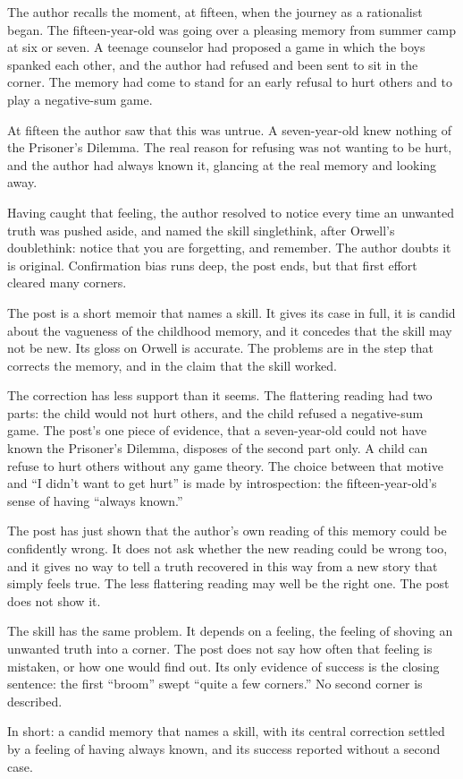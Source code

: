 \begin{afterword}
\summaryhead

The author recalls the moment, at fifteen, when the journey as a rationalist began. The fifteen-year-old was going over a pleasing memory from summer camp at six or seven. A teenage counselor had proposed a game in which the boys spanked each other, and the author had refused and been sent to sit in the corner. The memory had come to stand for an early refusal to hurt others and to play a negative-sum game.

At fifteen the author saw that this was untrue. A seven-year-old knew nothing of the Prisoner's Dilemma. The real reason for refusing was not wanting to be hurt, and the author had always known it, glancing at the real memory and looking away.

Having caught that feeling, the author resolved to notice every time an unwanted truth was pushed aside, and named the skill singlethink, after Orwell's doublethink: notice that you are forgetting, and remember. The author doubts it is original. Confirmation bias runs deep, the post ends, but that first effort cleared many corners.

\responsehead

The post is a short memoir that names a skill. It gives its case in full, it is candid about the vagueness of the childhood memory, and it concedes that the skill may not be new. Its gloss on Orwell is accurate. The problems are in the step that corrects the memory, and in the claim that the skill worked.

The correction has less support than it seems. The flattering reading had two parts: the child would not hurt others, and the child refused a negative-sum game. The post's one piece of evidence, that a seven-year-old could not have known the Prisoner's Dilemma, disposes of the second part only. A child can refuse to hurt others without any game theory. The choice between that motive and ``I didn't want to get hurt'' is made by introspection: the fifteen-year-old's sense of having ``always known.''

The post has just shown that the author's own reading of this memory could be confidently wrong. It does not ask whether the new reading could be wrong too, and it gives no way to tell a truth recovered in this way from a new story that simply feels true. The less flattering reading may well be the right one. The post does not show it.

The skill has the same problem. It depends on a feeling, the feeling of shoving an unwanted truth into a corner. The post does not say how often that feeling is mistaken, or how one would find out. Its only evidence of success is the closing sentence: the first ``broom'' swept ``quite a few corners.'' No second corner is described.

In short: a candid memory that names a skill, with its central correction settled by a feeling of having always known, and its success reported without a second case.
\end{afterword}
